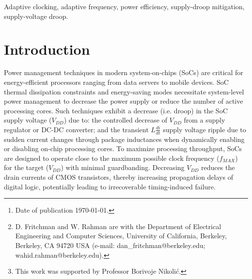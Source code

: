 \documentclass[twoside,9pt,journal,letterpage]{IEEEtran}
\title{\titlestr}
\author{
	Dan Fritchman, \IEEEmembership{Member, IEEE} and Wahid Rahman, \IEEEmembership{Member, IEEE}
	\thanks{Date of publication \monthdayyeardate\today.}
	\thanks{
		D. Fritchman and W. Rahman are with the Department of Electrical Engineering and Computer Sciences, University of California, Berkeley, Berkeley, CA 94720 USA (e-mail: dan\_fritchman@berkeley.edu; wahid.rahman@berkeley.edu).}
	\thanks{
		This work was supported by Professor Borivoje Nikoli\'{c}.}
}
\begin{document}
\maketitle
\IEEEpeerreviewmaketitle

\begin{abstract}
Adaptive clock generation techniques have emerged in recent generations of high-performance SoCs to mitigate timing failure due to supply voltage droops. Resilient techniques vary from analog voltage mixing to digital sensing and clock actuation. This work identifies a taxonomy for adaptive clock generation systems: adaptive clock distribution (ACD) and adaptive PLL-based schemes. Reported realizations in state-of-the-art processor SoCs are reviewed and key performance metrics for comparisons are identified. A PLL-based design is evaluated in a predictive 7nm CMOS technology and compared with prior works.
\end{abstract}

\begin{IEEEkeywords}
Adaptive clocking, adaptive frequency, power efficiency, supply-droop mitigation, supply-voltage droop.
\end{IEEEkeywords}

\maketitle

\section{Introduction}

Power management techniques in modern system-on-chips (SoCs) are critical for energy-efficient processors ranging from data servers to mobile devices. SoC thermal dissipation constraints and energy-saving modes necessitate system-level power management to decrease the power supply or reduce the number of active processing cores. Such techniques exhibit a decrease (i.e. droop) in the SoC supply voltage ($V_{DD}$) due to: the controlled decrease of $V_{DD}$ from a supply regulator or DC-DC converter; and the transient $L \frac{di}{dt}$ supply voltage ripple due to sudden current changes through package inductances when dynamically enabling or disabling on-chip processing cores. To maximize processing throughput, SoCs are designed to operate close to the maximum possible clock frequency ($f_{MAX}$) for the target ($V_{DD}$) with minimal guardbanding. Decreasing $V_{DD}$ reduces the drain currents of CMOS transistors, thereby increasing propagation delays of digital logic, potentially leading to irrecoverable timing-induced failure. 
\end{document}

